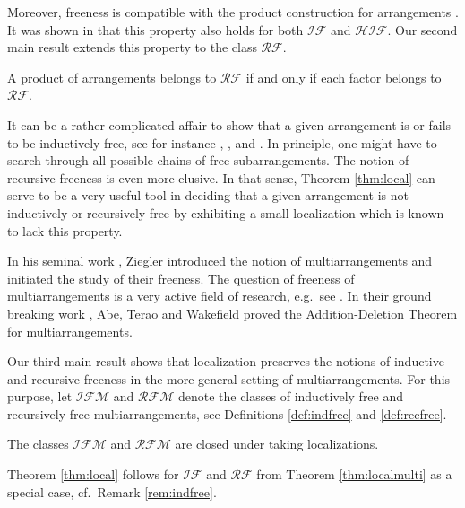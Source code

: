 Moreover, 
freeness is compatible with 
the product construction for arrangements 
\cite[Prop.\ 4.28]{orlikterao:arrangements}.
It was shown in \cite[Prop.\ 2.10, Cor.\ 2.12]{hogeroehrle:indfree}
that this property also holds for both ${{\mathcal {IF}}}$  and ${{\mathcal {HIF}}}$.
Our second main result extends this property to the class ${{\mathcal {RF}}}$.

\begin{theorem}
\label{thm:recfreeproducts}
A product of arrangements belongs to ${{\mathcal {RF}}}$ if and only if 
each factor belongs to ${{\mathcal {RF}}}$.
\end{theorem}

It can be a rather complicated affair to show that a given 
arrangement is or fails to be inductively free, see
for instance 
\cite[Lem.\ 4.2]{amendhogeroehrle:indfree},
\cite[\S 5.2]{cuntz:indfree}, and  
\cite[Lem.\ 3.5]{hogeroehrle:indfree}.  
In principle, one might have to search through
all possible chains of free subarrangements.
The notion of recursive freeness is even more 
elusive.
In that sense, Theorem \ref{thm:local} 
can serve to be a very useful tool in 
deciding that a given arrangement is not 
inductively or recursively free by 
exhibiting a small localization which 
is known to lack this property.

\medskip

In his seminal work \cite{ziegler:multiarrangements}, Ziegler 
introduced the notion of multiarrangements and initiated the study of their 
freeness.  
The question of freeness of 
multiarrangements 
is a very active field of research, 
e.g.~see \cite{yoshinaga:free14}.
In their ground breaking work 
\cite[Thm.\ 0.8]{abeteraowakefield:euler}, Abe, Terao and Wakefield
proved the 
Addition-Deletion Theorem for multiarrangements.

Our third main result shows that 
localization preserves the notions of 
inductive and recursive freeness in the more general setting of 
multiarrangements.
For this purpose, let 
${{\mathcal {IFM}}}$ and  ${{\mathcal {RFM}}}$ 
denote the classes of
inductively free and recursively free 
multiarrangements, see
Definitions \ref{def:indfree} and \ref{def:recfree}.

\begin{theorem}
\label{thm:localmulti}
The classes ${{\mathcal {IFM}}}$ and ${{\mathcal {RFM}}}$ are
closed under taking localizations.
\end{theorem}

Theorem \ref{thm:local} follows for ${{\mathcal {IF}}}$ and ${{\mathcal {RF}}}$ 
from 
Theorem \ref{thm:localmulti} as a special case, cf.~Remark \ref{rem:indfree}.

